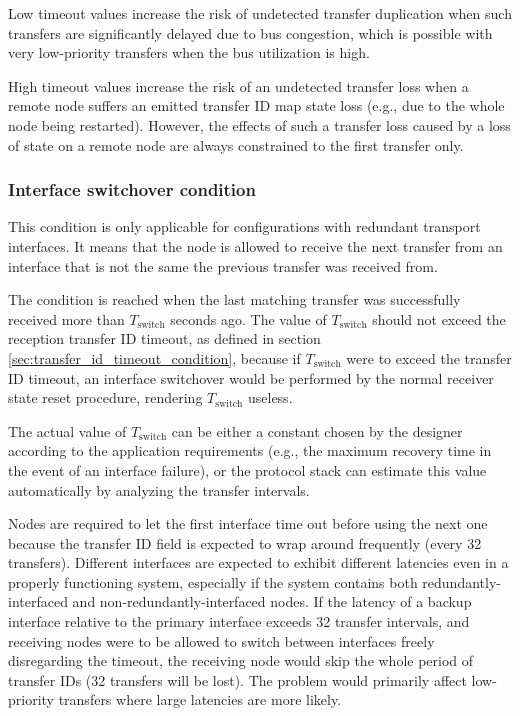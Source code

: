 Low timeout values increase the risk of undetected transfer duplication when such transfers are significantly
delayed due to bus congestion, which is possible with very low-priority transfers when the bus utilization is high.

High timeout values increase the risk of an undetected transfer loss when a remote node suffers an emitted transfer ID
map state loss (e.g., due to the whole node being restarted).
However, the effects of such a transfer loss caused by a loss of state on a remote node
are always constrained to the first transfer only.

\subsubsection{Interface switchover condition}\label{sec:transfer_interface_switchover_condition}

This condition is only applicable for configurations with redundant transport interfaces.
It means that the node is allowed to receive the next transfer from an interface that is not the same
the previous transfer was received from.

The condition is reached when the last matching transfer was successfully received more than
$T_\text{switch}$ seconds ago. The value of $T_\text{switch}$ should not exceed the reception transfer
ID timeout, as defined in section \ref{sec:transfer_id_timeout_condition},
because if $T_\text{switch}$ were to exceed the transfer ID timeout, an interface switchover would be
performed by the normal receiver state reset procedure, rendering $T_\text{switch}$ useless.

The actual value of $T_\text{switch}$ can be either a constant chosen by the designer according
to the application requirements (e.g., the maximum recovery time in the event of an interface failure),
or the protocol stack can estimate this value automatically by analyzing the transfer intervals.

Nodes are required to let the first interface time out before using the next one because the
transfer ID field is expected to wrap around frequently (every 32 transfers).
Different interfaces are expected to exhibit different latencies even in a properly functioning system,
especially if the system contains both redundantly-interfaced and non-redundantly-interfaced nodes.
If the latency of a backup interface relative to the primary interface exceeds 32 transfer intervals,
and receiving nodes were to be allowed to switch between interfaces freely disregarding the timeout,
the receiving node would skip the whole period of transfer IDs (32 transfers will be lost).
The problem would primarily affect low-priority transfers where large latencies are more likely.

